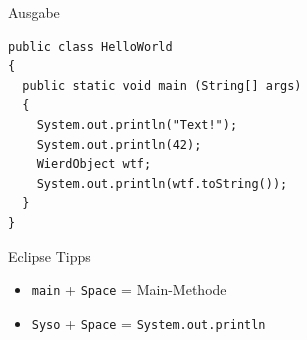 \documentclass{beamer}
\begin{document}
\begin{frame}[fragile]{Ausgabe}
\begin{lstlisting}
public class HelloWorld 
{ 
  public static void main (String[] args)
  {
    System.out.println("Text!");
    System.out.println(42);
    WierdObject wtf;
    System.out.println(wtf.toString());
  }
}
\end{lstlisting}
\end{frame}

\begin{frame}[fragile]{Eclipse Tipps}
\begin{itemize}
\item \texttt{main} + \texttt{Space} = Main-Methode
\item \texttt{Syso} + \texttt{Space} = \texttt{System.out.println}
\end{itemize}
\end{frame}
\end{document}
